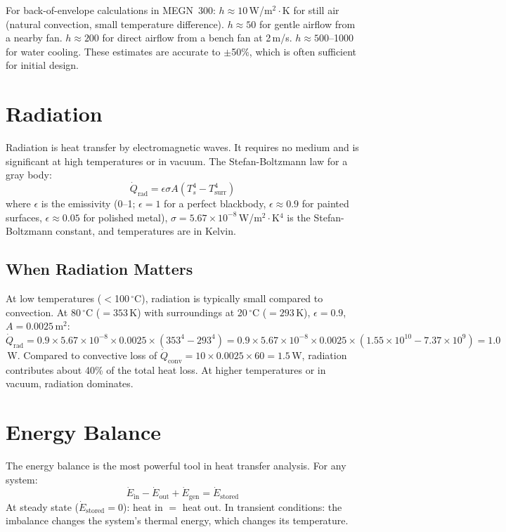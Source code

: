 \documentclass[11pt,letterpaper,twoside,openany]{book}
\newcommand{\degC}{\ensuremath{{}^{\circ}\text{C}}}
\begin{document}
\begin{tipbox}
For back-of-envelope calculations in MEGN~300: $h \approx 10$\,W/m$^2\cdot$K for still air (natural convection, small temperature difference). $h \approx 50$ for gentle airflow from a nearby fan. $h \approx 200$ for direct airflow from a bench fan at 2\,m/s. $h \approx 500$--1000 for water cooling. These estimates are accurate to $\pm$50\%, which is often sufficient for initial design.
\end{tipbox}

\section{Radiation}
Radiation is heat transfer by electromagnetic waves. It requires no medium and is significant at high temperatures or in vacuum. The Stefan-Boltzmann law for a gray body:
\begin{equation}
\dot{Q}_{\text{rad}} = \epsilon \sigma A (T_s^4 - T_{\text{surr}}^4)
\end{equation}
where $\epsilon$ is the emissivity (0--1; $\epsilon = 1$ for a perfect blackbody, $\epsilon \approx 0.9$ for painted surfaces, $\epsilon \approx 0.05$ for polished metal), $\sigma = 5.67 \times 10^{-8}$\,W/m$^2\cdot$K$^4$ is the Stefan-Boltzmann constant, and temperatures are in Kelvin.

\subsection{When Radiation Matters}
At low temperatures ($<$100\,\degC{}), radiation is typically small compared to convection. At 80\,\degC{} ($= 353$\,K) with surroundings at 20\,\degC{} ($= 293$\,K), $\epsilon = 0.9$, $A = 0.0025$\,m$^2$: $\dot{Q}_{\text{rad}} = 0.9 \times 5.67 \times 10^{-8} \times 0.0025 \times (353^4 - 293^4) = 0.9 \times 5.67 \times 10^{-8} \times 0.0025 \times (1.55 \times 10^{10} - 7.37 \times 10^{9}) = 1.0$\,W. Compared to convective loss of $\dot{Q}_{\text{conv}} = 10 \times 0.0025 \times 60 = 1.5$\,W, radiation contributes about 40\% of the total heat loss. At higher temperatures or in vacuum, radiation dominates.

\section{Energy Balance}
The energy balance is the most powerful tool in heat transfer analysis. For any system:
\begin{equation}
\dot{E}_{\text{in}} - \dot{E}_{\text{out}} + \dot{E}_{\text{gen}} = \dot{E}_{\text{stored}}
\end{equation}
At steady state ($\dot{E}_{\text{stored}} = 0$): heat in $=$ heat out. In transient conditions: the imbalance changes the system's thermal energy, which changes its temperature.
\end{document}
